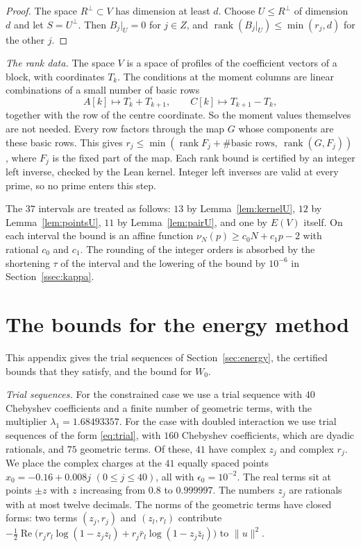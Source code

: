 \documentclass[11pt]{amsart}
\newcommand{\Kcoef}{160}
\newcommand{\Ngeo}{75}
\newcommand{\Ncomplex}{41}
\theoremstyle{definition}
\theoremstyle{remark}
\numberwithin{equation}{section}
\newcommand{\rank}{\operatorname{rank}}
\begin{document}
\begin{proof}
The space $R^\perp\subset V$ has dimension at least $d$. Choose $U\le R^\perp$ of dimension $d$ and let $S=U^\perp$. Then $B_j|_U=0$ for $j\in Z$, and $\rank(B_j|_U)\le\min(r_j,d)$ for
the other $j$.
\end{proof}

\emph{The rank data.} The space $V$ is a space of profiles of the coefficient vectors of a block, with coordinates
$T_k$. The conditions at the moment columns are linear combinations of a small number of basic rows
\[
 A[k]\mapsto T_k+T_{k+1},\qquad C[k]\mapsto T_{k+1}-T_k,
\]
together with the row of the centre coordinate. So the moment values themselves are not needed. Every row factors
through the map $G$ whose components are these basic rows. This gives $r_j\le\min(\rank F_j+\#\text{basic rows},\ \rank(G,F_j))$, where $F_j$ is the fixed part
of the map. Each rank bound is certified by an integer left inverse, checked by the Lean kernel. Integer left
inverses are valid at every prime, so no prime enters this step.

The $37$ intervals are treated as follows: $13$ by Lemma~\ref{lem:kernelU}, $12$ by Lemma~\ref{lem:pointsU}, $11$ by
Lemma~\ref{lem:pairU}, and one by $E(V)$ itself. On each interval the bound is an affine function
$\nu_N(p)\ge c_0N+c_1p-2$ with rational $c_0$ and $c_1$. The rounding of the integer orders is absorbed by
the shortening $\tau$ of the interval and the lowering of the bound by $10^{-6}$ in Section~\ref{ssec:kappa}.

\section{The bounds for the energy method}\label{app:field}

This appendix gives the trial sequences of Section~\ref{sec:energy}, the certified bounds that they satisfy, and
the bound for $W_0$.

\emph{Trial sequences.} For the constrained case we use a trial sequence with $40$ Chebyshev coefficients and a
finite number of geometric terms, with the multiplier $\lambda_1=1.68493357$. For the case with doubled
interaction we use trial sequences of the form \eqref{eq:trial}, with $\Kcoef$ Chebyshev coefficients, which are
dyadic rationals, and $\Ngeo$ geometric terms. Of these, $\Ncomplex$ have complex $z_j$ and complex $r_j$. We
place the complex charges at the $41$ equally spaced points $x_0=-0.16+0.008j$ $(0\le j\le40)$, all with
$\epsilon_0=10^{-2}$. The real terms sit at points $\pm z$ with $z$ increasing from $0.8$ to $0.999997$. The
numbers $z_j$ are rationals with at most twelve decimals. The norms of the geometric terms have closed forms:
two terms $(z_j,r_j)$ and $(z_l,r_l)$ contribute
$-\frac12\operatorname{Re}\bigl(r_jr_l\log(1-z_jz_l)+r_j\bar r_l\log(1-z_j\bar z_l)\bigr)$ to $\|u\|^2$.
\end{document}

